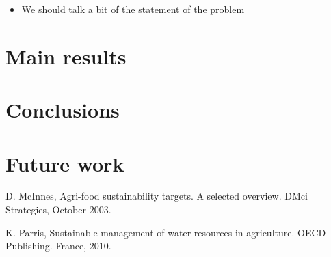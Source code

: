 \documentclass[11pt]{article}
\numberwithin{equation}{section}
\numberwithin{figure}{section}
\begin{document}
\begin{itemize}
\item We should talk a bit of the  statement of the problem 
\end{itemize}
\section{Main results}

\section{Conclusions}

\section{Future work}

\begin{thebibliography}{99}

{\sc D. McInnes},
Agri-food sustainability targets. A selected overview. DMci Strategies, October 2003.

{\sc K. Parris},
Sustainable management of water resources in agriculture. OECD Publishing. France, 2010.

 

\end{thebibliography}
\end{document}
